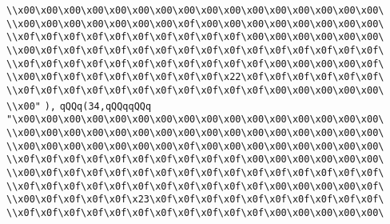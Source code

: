 \verb|\\x00\x00\x00\x00\x00\x00\x00\x00\x00\x00\x00\x00\x00\x00\x00\x00\|\newline
\verb|\\x00\x00\x00\x00\x00\x00\x00\x0f\x00\x00\x00\x00\x00\x00\x00\x00\|\newline
\verb|\\x0f\x0f\x0f\x0f\x0f\x0f\x0f\x0f\x0f\x0f\x00\x00\x00\x00\x00\x00\|\newline
\verb|\\x00\x0f\x0f\x0f\x0f\x0f\x0f\x0f\x0f\x0f\x0f\x0f\x0f\x0f\x0f\x0f\|\newline
\verb|\\x0f\x0f\x0f\x0f\x0f\x0f\x0f\x0f\x0f\x0f\x0f\x00\x00\x00\x00\x0f\|\newline
\verb|\\x00\x0f\x0f\x0f\x0f\x0f\x0f\x0f\x0f\x22\x0f\x0f\x0f\x0f\x0f\x0f\|\newline
\verb|\\x0f\x0f\x0f\x0f\x0f\x0f\x0f\x0f\x0f\x0f\x0f\x00\x00\x00\x00\x00\|\newline
\verb|\\x00"|\newline
\verb|),|\newline
\verb|qQQq(34,qQQqqQQq|\newline
\verb|"\x00\x00\x00\x00\x00\x00\x00\x00\x00\x00\x00\x00\x00\x00\x00\x00\|\newline
\verb|\\x00\x00\x00\x00\x00\x00\x00\x00\x00\x00\x00\x00\x00\x00\x00\x00\|\newline
\verb|\\x00\x00\x00\x00\x00\x00\x00\x0f\x00\x00\x00\x00\x00\x00\x00\x00\|\newline
\verb|\\x0f\x0f\x0f\x0f\x0f\x0f\x0f\x0f\x0f\x0f\x00\x00\x00\x00\x00\x00\|\newline
\verb|\\x00\x0f\x0f\x0f\x0f\x0f\x0f\x0f\x0f\x0f\x0f\x0f\x0f\x0f\x0f\x0f\|\newline
\verb|\\x0f\x0f\x0f\x0f\x0f\x0f\x0f\x0f\x0f\x0f\x0f\x00\x00\x00\x00\x0f\|\newline
\verb|\\x00\x0f\x0f\x0f\x0f\x23\x0f\x0f\x0f\x0f\x0f\x0f\x0f\x0f\x0f\x0f\|\newline
\verb|\\x0f\x0f\x0f\x0f\x0f\x0f\x0f\x0f\x0f\x0f\x0f\x00\x00\x00\x00\x00\|\newline
